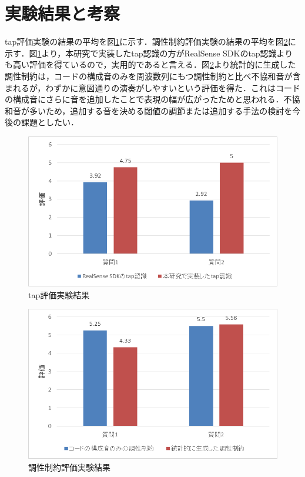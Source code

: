 \section{実験結果と考察}
tap評価実験の結果の平均を図\ref{img:result1}に示す．調性制約評価実験の結果の平均を図\ref{img:result2}に示す．図\ref{img:result1}より，本研究で実装したtap認識の方がRealSense SDKのtap認識よりも高い評価を得ているので，実用的であると言える．図\ref{img:result2}より統計的に生成した調性制約は，コードの構成音のみを周波数列にもつ調性制約と比べ不協和音が含まれるが，わずかに意図通りの演奏がしやすいという評価を得た．これはコードの構成音にさらに音を追加したことで表現の幅が広がったためと思われる．不協和音が多いため，追加する音を決める閾値の調節または追加する手法の検討を今後の課題としたい．
\begin{figure}[ht]
	\begin{center}
		\includegraphics[width=1.0\linewidth]{part/06.Evaluation/evalresult1.png}
		\caption{tap評価実験結果}
		\label{img:result1} 
	\end{center}
\end{figure}
\begin{figure}[ht]
	\begin{center}
		\includegraphics[width=1.0\linewidth]{part/06.Evaluation/evalresult2.png}
		\caption{調性制約評価実験結果}
		\label{img:result2} 
	\end{center}
\end{figure}